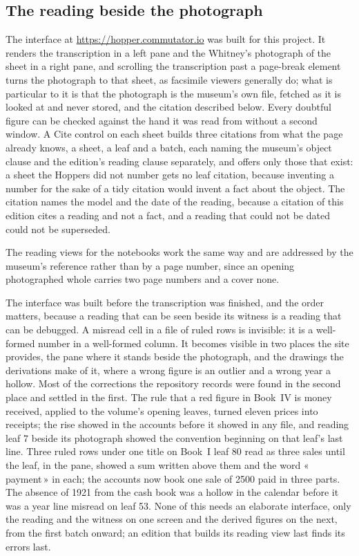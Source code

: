 \documentclass[11pt]{article}
\newcommand{\q}[1]{«\,#1\,»}
\begin{document}
\subsection{The reading beside the photograph}

The interface at \url{https://hopper.commutator.io} was built for this project. It renders the transcription in a left pane and the Whitney's photograph of the sheet in a right pane, and scrolling the transcription past a page-break element turns the photograph to that sheet, as facsimile viewers generally do; what is particular to it is that the photograph is the museum's own file, fetched as it is looked at and never stored, and the citation described below. Every doubtful figure can be checked against the hand it was read from without a second window. A Cite control on each sheet builds three citations from what the page already knows, a sheet, a leaf and a batch, each naming the museum's object clause and the edition's reading clause separately, and offers only those that exist: a sheet the Hoppers did not number gets no leaf citation, because inventing a number for the sake of a tidy citation would invent a fact about the object. The citation names the model and the date of the reading, because a citation of this edition cites a reading and not a fact, and a reading that could not be dated could not be superseded.

The reading views for the notebooks work the same way and are addressed by the museum's reference rather than by a page number, since an opening photographed whole carries two page numbers and a cover none.

The interface was built before the transcription was finished, and the order
matters, because a reading that can be seen beside its witness is a reading
that can be debugged. A misread cell in a file of ruled rows is invisible: it
is a well-formed number in a well-formed column. It becomes visible in two
places the site provides, the pane where it stands beside the photograph, and
the drawings the derivations make of it, where a wrong figure is an outlier
and a wrong year a hollow. Most of the corrections the repository records
were found in the second place and settled in the first. The rule that a red
figure in Book~IV is money received, applied to the volume's opening leaves,
turned eleven prices into receipts; the rise showed in the accounts before it
showed in any file, and reading leaf 7 beside its photograph showed the
convention beginning on that leaf's last line. Three ruled rows under one
title on Book~I leaf 80 read as three sales until the leaf, in the pane,
showed a sum written above them and the word \q{payment} in each; the
accounts now book one sale of 2500 paid in three parts. The absence of 1921
from the cash book was a hollow in the calendar before it was a year line
misread on leaf 53. None of this needs an elaborate interface, only the reading and the witness
on one screen and the derived figures on the next, from the first batch
onward; an edition that builds its reading view last finds its errors last.
\end{document}
